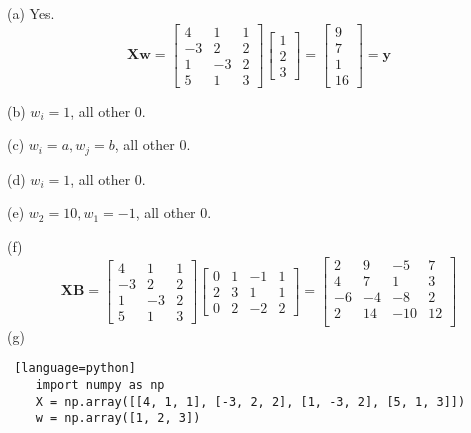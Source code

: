 \documentclass[a4paper, 12pt]{article}
\begin{document}
\begin{problem}
\end{problem}
\begin{solution}
    (a) Yes.\[
        \mathbf{Xw} = \begin{bmatrix}
            4  & 1  & 1 \\
            -3 & 2  & 2 \\
            1  & -3 & 2 \\
            5  & 1  & 3
        \end{bmatrix}\begin{bmatrix}
            1 \\
            2 \\
            3
        \end{bmatrix} = \begin{bmatrix}
            9 \\
            7 \\
            1 \\
            16
        \end{bmatrix} = \mathbf{y}
    \]

    (b) $w_i = 1$, all other 0.

    (c) $w_i = a, w_j = b$, all other 0.

    (d) $w_i = 1$, all other 0.

    (e) $w_2 = 10, w_1 = -1$, all other 0.

    (f) \[
        \mathbf{XB} = \begin{bmatrix}
            4  & 1  & 1 \\
            -3 & 2  & 2 \\
            1  & -3 & 2 \\
            5  & 1  & 3
        \end{bmatrix} \begin{bmatrix}
            0 & 1 & -1 & 1 \\
            2 & 3 & 1  & 1 \\
            0 & 2 & -2 & 2
        \end{bmatrix} = \begin{bmatrix}
            2  & 9  & -5  & 7  \\
            4  & 7  & 1   & 3  \\
            -6 & -4 & -8  & 2  \\
            2  & 14 & -10 & 12 \\
        \end{bmatrix}
    \]
    (g)
    \begin{lstlisting} [language=python]
    import numpy as np
    X = np.array([[4, 1, 1], [-3, 2, 2], [1, -3, 2], [5, 1, 3]])
    w = np.array([1, 2, 3])
    

\end{lstlisting}
\end{solution}
\end{document}
